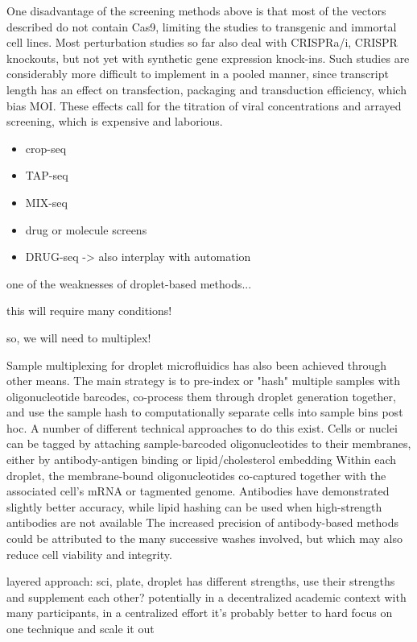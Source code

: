 One disadvantage of the screening methods above is that most of the vectors described do not contain Cas9, limiting the studies to transgenic and immortal cell lines. Most perturbation studies so far also deal with CRISPRa/i, CRISPR knockouts, but not yet with synthetic gene expression knock-ins. Such studies are considerably more difficult to implement in a pooled manner, since transcript length has an effect on transfection, packaging and transduction efficiency, which bias MOI. These effects call for the titration of viral concentrations and arrayed screening, which is expensive and laborious.

\begin{itemize}
    \item crop-seq
    \item TAP-seq
    \item MIX-seq
    \item drug or molecule screens
    \item DRUG-seq -> also interplay with automation
\end{itemize}

one of the weaknesses of droplet-based methods...

this will require many conditions!

so, we will need to multiplex!

Sample multiplexing for droplet microfluidics has also been achieved through other means. The main strategy is to pre-index or "hash" multiple samples with oligonucleotide barcodes, co-process them through droplet generation together, and use the sample hash to computationally separate cells into sample bins post hoc. A number of different technical approaches to do this exist. Cells or nuclei can be tagged by attaching sample-barcoded oligonucleotides to their membranes, either by antibody-antigen binding or lipid/cholesterol embedding Within each droplet, the membrane-bound oligonucleotides co-captured together with the associated cell's mRNA or tagmented genome. Antibodies have demonstrated slightly better accuracy, while lipid hashing can be used when high-strength antibodies are not available The increased precision of antibody-based methods could be attributed to the many successive washes involved, but which may also reduce cell viability and integrity.

layered approach: sci, plate, droplet has different strengths, use their strengths and supplement each other? potentially in a decentralized academic context with many participants, in a centralized effort it's probably better to hard focus on one technique and scale it out

